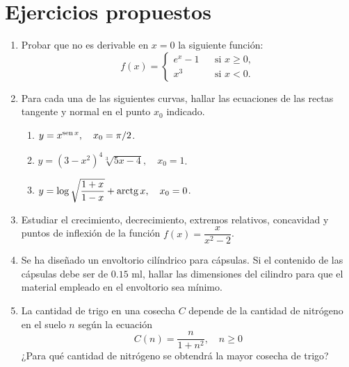 \section{Ejercicios propuestos}
\begin{enumerate}[leftmargin=*]
\item  Probar que no es derivable en $x=0$ la siguiente función:
      \[ f(x)=\left\{
      \begin{array}{ccl}
      e^x-1 &  & \mbox{si } x\geq 0, \\
      x^3   &  & \mbox{si } x<0.
      \end{array}\right.
      \]

\item  Para cada una de las siguientes curvas, hallar las ecuaciones de las rectas tangente y normal en el punto $x_{0}$ indicado.
      \begin{enumerate}
      \item  $y=x^{\operatorname{sen} x},\quad x_{0}=\pi/2$.
      \item  $y=(3-x^2)^4\sqrt[3]{5x-4},\quad x_{0}=1$.
      \item  $y=\log \sqrt{\dfrac{1+x}{1-x}}+\operatorname{arctg} x, \quad x_{0}=0$.
      \end{enumerate}

\item Estudiar el crecimiento, decrecimiento, extremos relativos, concavidad y puntos de inflexión de la función $f(x)=\dfrac{x}{x^2-2}$.

\item Se ha diseñado un envoltorio cilíndrico para cápsulas.
      Si el contenido de las cápsulas debe ser de $0.15$ ml, hallar las dimensiones del cilindro para que el material empleado en el envoltorio
      sea mínimo.

\item La cantidad de trigo en una cosecha $C$ depende de la cantidad de nitrógeno en el suelo $n$ según la ecuación
      \[
      C(n) = \frac{n}{1+n^2}, \quad n\geq0
      \]
      ¿Para qué cantidad de nitrógeno se obtendrá la mayor cosecha de trigo?
\end{enumerate}
